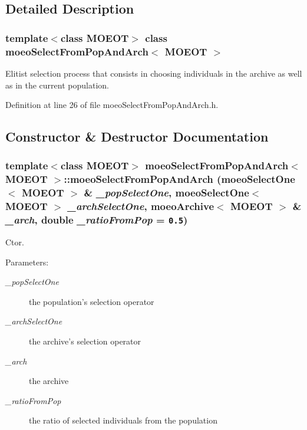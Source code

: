 \subsection{Detailed Description}
\subsubsection*{template$<$class MOEOT$>$ class moeo\-Select\-From\-Pop\-And\-Arch$<$ MOEOT $>$}

Elitist selection process that consists in choosing individuals in the archive as well as in the current population. 



Definition at line 26 of file moeo\-Select\-From\-Pop\-And\-Arch.h.

\subsection{Constructor \& Destructor Documentation}
\subsubsection{\setlength{\rightskip}{0pt plus 5cm}template$<$class MOEOT$>$ \bf{moeo\-Select\-From\-Pop\-And\-Arch}$<$ MOEOT $>$::\bf{moeo\-Select\-From\-Pop\-And\-Arch} (\bf{moeo\-Select\-One}$<$ MOEOT $>$ \& {\em \_\-pop\-Select\-One}, \bf{moeo\-Select\-One}$<$ MOEOT $>$ {\em \_\-arch\-Select\-One}, \bf{moeo\-Archive}$<$ MOEOT $>$ \& {\em \_\-arch}, double {\em \_\-ratio\-From\-Pop} = {\tt 0.5})\hspace{0.3cm}{\tt  [inline]}}\label{classmoeoSelectFromPopAndArch_96b34f67d678a7df7610f28bf10c4e86}


Ctor. 

\begin{Desc}
\item[Parameters:]
\begin{description}
\item[{\em \_\-pop\-Select\-One}]the population's selection operator \item[{\em \_\-arch\-Select\-One}]the archive's selection operator \item[{\em \_\-arch}]the archive \item[{\em \_\-ratio\-From\-Pop}]the ratio of selected individuals from the population \end{description}
\end{Desc}


